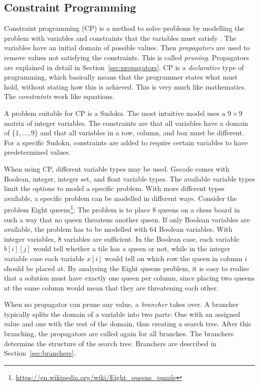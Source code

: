 \documentclass[a4paper,11pt]{article}
\begin{document}
\subsection{Constraint Programming}
\label{sec:constraintp}
Constraint programming (CP) is a method to solve problems by modelling the problem with variables and constraints that the variables must satisfy \cite{FruehwirthMS06}. The variables have an initial domain of possible values. Then \textit{propagators} are used to remove values not satisfying the constraints. This is called \textit{pruning}. Propagators are explained in detail in Section~\ref{sec:propagators}. CP is a \textit{declarative} type of programming, which basically means that the programmer states what must hold, without stating how this is achieved. This is very much like mathematics. The \textit{constraints} work like equations.

A problem suitable for CP is a Sudoku. The most intuitive model uses a $9\times9$ matrix of integer variables. The constraints are that all variables have a domain of $\{1,\ldots,9\}$ and that all variables in a row, column, and box must be different. For a specific Sudoku, constraints are added to require certain variables to have predetermined values.

When using CP, different variable types may be used. Gecode comes with Boolean, integer, integer set, and float variable types. The available variable types limit the options to model a specific problem. With more different types available, a specific problem can be modelled in different ways. Consider the problem Eight queens\footnote{\url{https://en.wikipedia.org/wiki/Eight_queens_puzzle}}: The problem is to place 8 queens on a chess board in such a way that no queen threatens another queen. If only Boolean variables are available, the problem has to be modelled with 64 Boolean variables. With integer variables, 8 variables are sufficient. In the Boolean case, each variable $b[i][j]$ would tell whether a tile has a queen or not, while in the integer variable case each variable $x[i]$ would tell on which row the queen in column $i$ should be placed at. By analysing the Eight queens problem, it is easy to realise that a solution must have exactly one queen per column, since placing two queens at the same column would mean that they are threatening each other. 

When no propagator can prune any value, a \textit{brancher} takes over. A brancher typically splits the domain of a variable into two parts: One with an assigned value and one with the rest of the domain, thus creating a search tree. After this branching, the propagators are called again for all branches. The branchers determine the structure of the search tree. Branchers are described in Section~\ref{sec:branchers}. 
\end{document}
